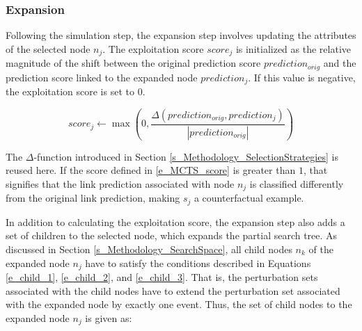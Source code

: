 \FloatBarrier
\subsubsection{Expansion}
\label{s_Methodology_CoDy_Expansion}

Following the simulation step, the expansion step involves updating the attributes of the selected node $n_j$. The exploitation score $score_j$ is initialized as the relative magnitude of the shift between the original prediction score $prediction_{orig}$ and the prediction score linked to the expanded node $prediction_j$. If this value is negative, the exploitation score is set to $0$. 

\begin{equation}
    \label{e_MCTS_score}
    score_j \gets \max\left(0, \frac{\Delta(prediction_{orig}, prediction_j)}{|prediction_{orig}|}\right)
\end{equation}

The $\Delta$-function introduced in Section \ref{s_Methodology_SelectionStrategies} is reused here. If the score defined in \ref{e_MCTS_score} is greater than $1$, that signifies that the link prediction associated with node $n_j$ is classified differently from the original link prediction, making $s_j$ a counterfactual example.

In addition to calculating the exploitation score, the expansion step also adds a set of children to the selected node, which expands the partial search tree. As discussed in Section \ref{s_Methodology_SearchSpace}, all child nodes $n_k$ of the expanded node $n_j$ have to satisfy the conditions described in Equations \ref{e_child_1}, \ref{e_child_2}, and \ref{e_child_3}. That is, the perturbation sets associated with the child nodes have to extend the perturbation set associated with the expanded node by exactly one event. Thus, the set of child nodes to the expanded node $n_j$ is given as:




